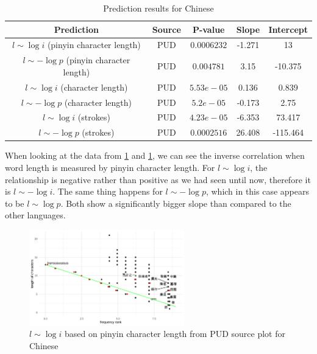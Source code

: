 \begin{table}[H]
    \centering
    \begin{tabular}{c|c|c|c|c}
        Prediction & Source & P-value & Slope & Intercept \\ \hline
        $l \sim \log i$ (pinyin character length) & PUD & $0.0006232$ & -1.271 & 13 \\
        $l \sim -\log p$ (pinyin character length) & PUD & $0.004781$ & 3.15 & -10.375 \\
        $l \sim \log i$ (character length) & PUD & $5.53e-05$ & 0.136 & 0.839 \\
        $l \sim -\log p$ (character length) & PUD & $5.2e-05$ & -0.173 & 2.75 \\
        $l \sim \log i$ (strokes) & PUD & $4.23e-05$ & -6.353 & 73.417 \\
        $l \sim -\log p$ (strokes) & PUD & $0.0002516$ & 26.408 & -115.464 \\
    \end{tabular}
    \caption{Prediction results for Chinese}
    \label{tab:chineseresults}
\end{table}

When looking at the data from \cref{chinese_logi_cl_PUD_pinyin} and \cref{chinese_logi_cl_PUD_pinyin}, we can see the inverse correlation when word length is measured by pinyin character length. For $l \sim \log i$, the relationship is negative rather than positive as we had seen until now, therefore it is $l \sim -\log i$. The same thing happens for $l \sim -\log p$, which in this case appears to be $l \sim \log p$. Both show a significantly bigger slope than compared to the other languages.

\begin{figure}[H]
    \centering
    \includegraphics[width=0.6\textwidth]{plots/Chinese_logi_cl_PUD_pinyin.pdf}
    \caption{$l \sim \log i$ based on pinyin character length from PUD source plot for Chinese}
    \label{chinese_logi_cl_PUD_pinyin}
\end{figure}


